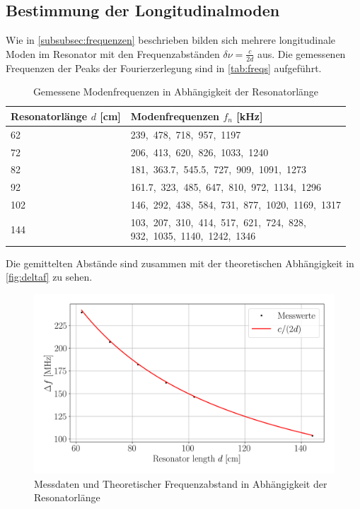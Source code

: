 \subsection{Bestimmung der Longitudinalmoden}
Wie in \autoref{subsubsec:frequenzen} beschrieben bilden sich mehrere longitudinale Moden im Resonator mit den Frequenzabständen $\delta\nu=\frac{c}{2d}$ aus.
Die gemessenen Frequenzen der Peaks der Fourierzerlegung sind in \autoref{tab:freqs} aufgeführt.
\begin{table}[H]
    \centering
    \caption{Gemessene Modenfrequenzen in Abhängigkeit der Resonatorlänge}
    \label{tab:freqs}
    \begin{tabular}{l | l}
      \toprule
      {Resonatorlänge $d$ [\si{\centi\meter}]} & {Modenfrequenzen $f_n$ [\si{\kilo\hertz}]} \\
      \midrule
      62  & 239,\ 478,\ 718,\ 957,\ 1197 \\
      72  & 206,\ 413,\ 620,\ 826,\ 1033,\ 1240 \\
      82  & 181,\ 363.7,\ 545.5,\ 727,\ 909,\ 1091,\ 1273 \\
      92  & 161.7,\ 323,\ 485,\ 647,\ 810,\ 972,\ 1134,\ 1296 \\
      102 & 146,\ 292,\ 438,\ 584,\ 731,\ 877,\ 1020,\ 1169,\ 1317 \\
      144 & \makecell[l]{103,\ 207,\ 310,\ 414,\ 517,\ 621,\ 724,\ 828,\\ 932,\ 1035,\ 1140,\ 1242,\ 1346} \\
      \bottomrule
    \end{tabular}
\end{table}
Die gemittelten Abstände sind zusammen mit der theoretischen Abhängigkeit in \autoref{fig:deltaf} zu sehen.
\begin{figure}[H]
    \centering
    \includegraphics[scale=0.55]{Skripte/deltaf.png}
    \caption{Messdaten und Theoretischer Frequenzabstand in Abhängigkeit der Resonatorlänge}\label{fig:deltaf}
\end{figure}
